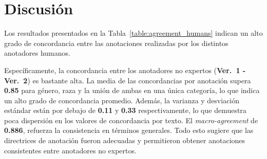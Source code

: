 \begin{table}[htpb]
    \centering
    \caption{Resumen de m\'etricas de concordancia entre \emph{ChatGPT} y corpus final.}
    \label{table:agreement_gpt}
\end{table}


\section{Discusi\'on}
Los resultados presentados en la Tabla~\ref{table:agreement_humans} indican un alto grado de concordancia entre las 
anotaciones realizadas por los distintos anotadores humanos.

Espec\'ificamente, la concordancia entre los anotadores no expertos (\textbf{Ver.~1 - Ver.~2}) es bastante alta. La
media de las concordancias por anotaci\'on supera \textbf{0.85} para g\'enero, raza y la uni\'on de ambas en una \'unica categor\'ia,
lo que indica un alto grado de concordancia promedio. Adem\'as, la varianza y desviaci\'on est\'andar est\'an por debajo de 
\textbf{0.11} y \textbf{0.33} respectivamente, lo que demuestra poca dispersi\'on en los valores de concordancia por texto. El
\emph{macro-agreement} de \textbf{0.886}, refuerza la consistencia en t\'erminos generales. Todo esto sugiere que las directrices 
de anotaci\'on fueron adecuadas y permitieron obtener anotaciones consistentes entre anotadores no expertos.

